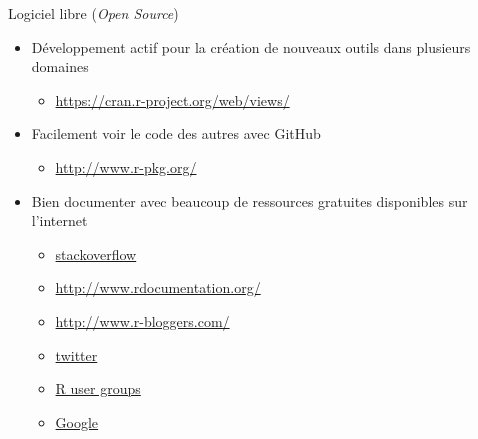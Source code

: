 \documentclass[11pt]{beamer}\usepackage[]{graphicx}\usepackage[]{color}
\begin{document}
\begin{frame}{Logiciel libre (\textit{Open Source})}

\begin{itemize}
  \setlength\itemsep{1.5em}
\item D\'{e}veloppement actif pour la cr\'{e}ation de nouveaux outils dans plusieurs domaines  
\begin{itemize}
\item \href{https://cran.r-project.org/web/views/}{https://cran.r-project.org/web/views/}
\end{itemize} 
\item Facilement voir le code des autres avec GitHub 
\begin{itemize}
\item \href{http://www.r-pkg.org/}{http://www.r-pkg.org/}
\end{itemize}
\item Bien documenter avec beaucoup de ressources gratuites disponibles sur l'internet  
\begin{itemize}
\item \href{http://stackoverflow.com/questions/tagged/r}{stackoverflow}
\item \href{http://www.rdocumentation.org/}{http://www.rdocumentation.org/} \item \href{http://www.r-bloggers.com/}{http://www.r-bloggers.com/} 
\item \href{https://twitter.com/search?q=\%23rstats}{twitter} 
\item \href{http://blog.revolutionanalytics.com/local-r-groups.html}{R user groups}
\item \href{https://www.google.ca/}{Google}
\end{itemize}
\end{itemize}


\end{frame}
\end{document}
